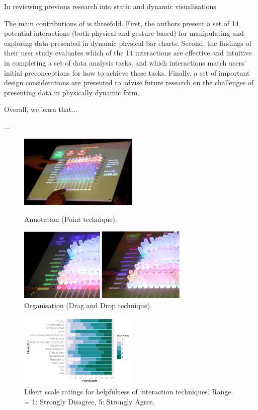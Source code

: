 \documentclass[11pt]{article}
\begin{document}
In reviewing previous research into static and dynamic visualisations

The main contributions of \citet{taher2015} is threefold. First, the authors present a set of 14 potential interactions (both physical and gesture based) for manipulating and exploring data presented in dynamic physical bar charts. Second, the findings of their user study evaluates which of the 14 interactions are effective and intuitive in completing a set of data analysis tasks, and which interactions match users' initial preconceptions for how to achieve these tasks. Finally, a set of important design considerations are presented to advise future research on the challenges of presenting data in physically dynamic form.

Overall, we learn that...

...

\begin{figure}[H]
\centering
  \includegraphics[height=3.5cm]{img/taher2015-annotation.png}
  \caption{Annotation (Point technique).}\label{fig:taher2015-annotation}
\endminipage\hfill
{}%
\centering
  \includegraphics[height=3.5cm]{img/taher2015-organize.png}
  \caption{Organisation (Drag and Drop technique).}\label{fig:taher2015-organize}
\endminipage
\end{figure}

\begin{figure}[H]
\centering
\includegraphics[width=0.5\textwidth]{img/taher2015-likert.png} 
\caption{Likert scale ratings for helpfulness of interaction
techniques. Range = 1: Strongly Disagree, 5: Strongly Agree.}\label{fig:taher2015-likert}
\end{figure}
\end{document}
